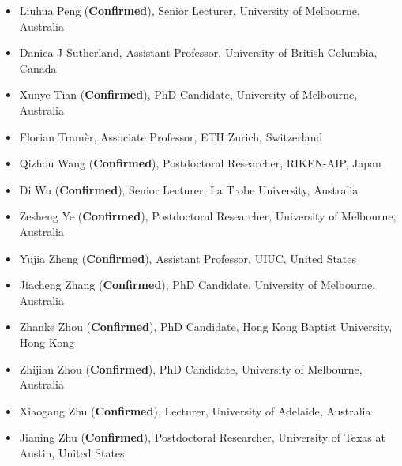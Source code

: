 \documentclass{article}
\newcommand{\confirmed}{\textcolor{green!60!black}{\textbf{Confirmed}}}
\begin{document}
\begin{itemize}[leftmargin=10pt,nosep]
\item Liuhua Peng (\confirmed), Senior Lecturer, University of Melbourne, Australia
\item Danica J Sutherland, Assistant Professor, University of British Columbia, Canada
\item Xunye Tian (\confirmed), PhD Candidate, University of Melbourne, Australia
\item Florian Tramèr, Associate Professor, ETH Zurich, Switzerland
\item Qizhou Wang (\confirmed), Postdoctoral Researcher, RIKEN-AIP, Japan
\item Di Wu (\confirmed), Senior Lecturer, La Trobe University, Australia
\item Zesheng Ye (\confirmed), Postdoctoral Researcher, University of Melbourne, Australia
\item Yujia Zheng (\confirmed), Assistant Professor, UIUC, United States
\item Jiacheng Zhang (\confirmed), PhD Candidate, University of Melbourne, Australia
\item Zhanke Zhou (\confirmed), PhD Candidate, Hong Kong Baptist University, Hong Kong
\item Zhijian Zhou (\confirmed), PhD Candidate, University of Melbourne, Australia
\item Xiaogang Zhu (\confirmed), Lecturer, University of Adelaide, Australia
\item Jianing Zhu (\confirmed), Postdoctoral Researcher, University of Texas at Austin, United States


\end{itemize}


\newpage



\end{document}
